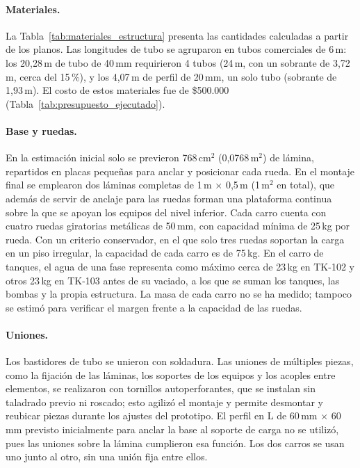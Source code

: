 \paragraph{Materiales.} La Tabla~\ref{tab:materiales_estructura} presenta las cantidades calculadas a partir de los planos. Las longitudes de tubo se agruparon en tubos comerciales de 6\,m: los 20,28\,m de tubo de 40\,mm requirieron 4 tubos (24\,m, con un sobrante de 3,72\,m, cerca del 15\,\%), y los 4,07\,m de perfil de 20\,mm, un solo tubo (sobrante de 1,93\,m). El costo de estos materiales fue de \$500.000 (Tabla~\ref{tab:presupuesto_ejecutado}).



\paragraph{Base y ruedas.} En la estimación inicial solo se previeron 768\,cm$^2$ (0,0768\,m$^2$) de lámina, repartidos en placas pequeñas para anclar y posicionar cada rueda. En el montaje final se emplearon dos láminas completas de 1\,m $\times$ 0,5\,m (1\,m$^2$ en total), que además de servir de anclaje para las ruedas forman una plataforma continua sobre la que se apoyan los equipos del nivel inferior. Cada carro cuenta con cuatro ruedas giratorias metálicas de 50\,mm, con capacidad mínima de 25\,kg por rueda. Con un criterio conservador, en el que solo tres ruedas soportan la carga en un piso irregular, la capacidad de cada carro es de 75\,kg. En el carro de tanques, el agua de una fase representa como máximo cerca de 23\,kg en TK-102 y otros 23\,kg en TK-103 antes de su vaciado, a los que se suman los tanques, las bombas y la propia estructura. La masa de cada carro no se ha medido; tampoco se estimó para verificar el margen frente a la capacidad de las ruedas.
 
\paragraph{Uniones.} Los bastidores de tubo se unieron con soldadura. Las uniones de múltiples piezas, como la fijación de las láminas, los soportes de los equipos y los acoples entre elementos, se realizaron con tornillos autoperforantes, que se instalan sin taladrado previo ni roscado; esto agilizó el montaje y permite desmontar y reubicar piezas durante los ajustes del prototipo. El perfil en L de 60\,mm $\times$ 60\,mm previsto inicialmente para anclar la base al soporte de carga no se utilizó, pues las uniones sobre la lámina cumplieron esa función. Los dos carros se usan uno junto al otro, sin una unión fija entre ellos.
 
